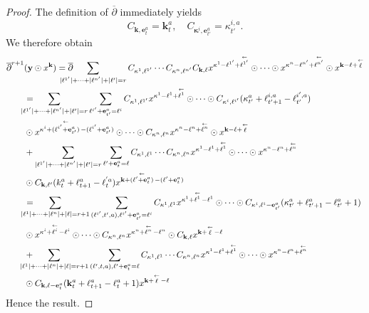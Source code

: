 \documentclass[a4paper,11pt]{article}
\def\shift#1{\mathop{#1}^{\leftarrow}\limits}
\begin{document}
\begin{proof}
The definition of $\overline{\partial}$ immediately yields
\[
C_{\mathbf k, \mathbf e_t^a} = \mathbf k_t^a,\quad
C_{\mathbf \kappa^i, \mathbf e_{t'}^a} = \kappa^{i,a}_{t'}.
\]
We therefore obtain
\begin{align*}
\overline{\partial}^{r+1}&( \mathbf  y\odot  x^{\mathbf k})
  =\overline{\partial}\hskip-6mm\sum_{\vert \ell^{1'}\vert + \cdots + \vert \ell^{n'}\vert + \vert \ell'\vert=r} C_{\kappa^1, \ell^{1'}}\cdots C_{\kappa^n, \ell^{n'}}C_{\mathbf k, \ell} x^{\kappa^1 - \ell^{1'} + \shift{\ell^{1'}}}\odot \cdots\odot x^{\kappa^n - \ell^{n'} + \shift{\ell^{n'}}}\odot x^{\mathbf k - \ell + \shift{\ell}}\\
 & =\hskip-6mm\sum_{\vert \ell^{1'}\vert + \cdots + \vert \ell^{n'}\vert + \vert \ell'\vert=r}\sum_{\ell^{i'} + \mathbf e_{t'}^a = \ell^i }C_{\kappa^1, \ell^{1'}} x^{\kappa^1 - \ell^1 + \shift{\ell^1}}\odot \cdots \odot  C_{\kappa^i, \ell^{i'} }(\kappa_{t'}^a + \ell_{t'+1}^{i,a} - \ell_{t'}^{i',a}) \\
 & \odot  x^{\kappa^i + \shift{(\ell^{i'}+ \mathbf e_{t'}^{a}) } - (\ell^{i'} + \mathbf e_{t'}^a)}\odot \cdots \odot C_{\kappa^n, \ell^n} x^{\kappa^n - \ell^n + \shift{\ell^n}}\odot    x^{\mathbf k - \ell + \shift{\ell}}\\
 & +\sum_{\vert \ell^{1'}\vert + \cdots + \vert \ell^{n'}\vert + \vert \ell'\vert=r}\sum_{\ell' + \mathbf e_t^a =\ell }C_{\kappa^1, \ell^1}\cdots C_{\kappa^n, \ell^n} x^{\kappa^1 - \ell^1 + \shift{\ell^1}}\odot  \cdots\odot  x^{\kappa^n - \ell^n + \shift{\ell^n}}\\
 & \odot C_{\mathbf k, \ell'}(k_t^a + \ell_{t+1}^a - \ell^{'a}_t)x^{\mathbf k + \shift{(\ell' + \mathbf e_t^a)} - (\ell' + \mathbf e_t^a)}\\
 & =\hskip -6mm \sum_{\vert \ell^{1}\vert + \cdots + \vert \ell^{n}\vert + \vert \ell\vert=r + 1}\sum_{(\ell^{i'}, t', a), \ell^{i'} + \mathbf e_{t'}^a=\ell^i}C_{\kappa^1, \ell^1} x^{\kappa^1 + \shift{\ell^1} - \ell^1}\odot \cdots\odot C_{\kappa^i, \ell^i - \mathbf e_{t'}^a}(\kappa_{t'}^a + \ell_{t'+1}^a - \ell_{t'}^a + 1) \\
 & \odot x^{\kappa^i + \shift{\ell^i} - \ell^i}\odot \cdots \odot C_{\kappa^n, \ell^n} x^{\kappa^n + \shift{\ell^n} - \ell^n}\odot C_{\mathbf k, \ell} x^{\mathbf k + \shift{\ell} - \ell}\\
 & + \hskip-6mm\sum_{\vert \ell^{1}\vert + \cdots + \vert \ell^{n}\vert + \vert \ell\vert=r + 1}\sum_{(\ell', t, a), \ell' + \mathbf e_t^a=\ell} C_{\kappa^1, \ell^1}\cdots C_{\kappa^n, \ell^n} x^{\kappa^1 - \ell^1 + \shift{\ell^1}}\odot \cdots\odot  x^{\kappa^n - \ell^n + \shift{\ell^n}}\\
 &   \odot C_{\mathbf k, \ell - \mathbf e_t^a}(\mathbf k_t^a + \ell_{t+1}^a - \ell_t^a + 1) x^{\mathbf k + \shift{\ell} - \ell}
\end{align*}
Hence the result.
\end{proof}
\end{document}
